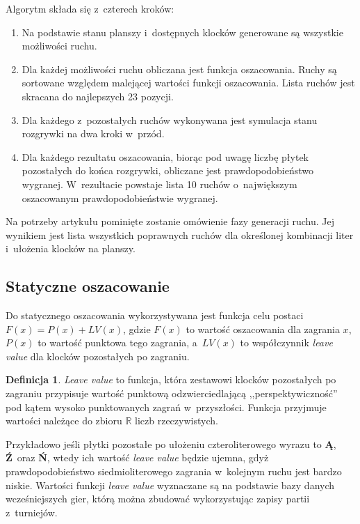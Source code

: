 \documentclass[a4paper,twocolumn,12pt]{article}
\theoremstyle{definition}
\newtheorem{definition}{Definicja}
\begin{document}
Algorytm składa się z~czterech kroków:

\begin{enumerate}
	\item Na podstawie stanu planszy i~dostępnych klocków generowane są wszystkie możliwości ruchu.
	\item Dla każdej możliwości ruchu obliczana jest funkcja oszacowania. Ruchy są sortowane względem malejącej wartości funkcji oszacowania. Lista ruchów jest skracana do najlepszych 23 pozycji.
	\item Dla każdego z~pozostałych ruchów wykonywana jest symulacja stanu rozgrywki na dwa kroki w~przód.
	\item Dla każdego rezultatu oszacowania, biorąc pod uwagę liczbę płytek pozostałych do końca rozgrywki, obliczane jest prawdopodobieństwo wygranej. W~rezultacie powstaje lista 10 ruchów o~największym oszacowanym prawdopodobieństwie wygranej.
\end{enumerate}

Na potrzeby artykułu pominięte zostanie omówienie fazy generacji ruchu. Jej wynikiem jest lista wszystkich poprawnych ruchów dla określonej kombinacji liter i~ułożenia klocków na planszy.

\subsection*{Statyczne oszacowanie}

Do statycznego oszacowania wykorzystywana jest funkcja celu postaci $F(x) = P(x) + LV(x)$, gdzie $F(x)$ to wartość oszacowania dla zagrania $x$, $P(x)$ to wartość punktowa tego zagrania, a~$LV(x)$ to współczynnik \emph{leave value} dla klocków pozostałych po zagraniu.

\begin{definition}
	\emph{Leave value} to funkcja, która zestawowi klocków pozostałych po zagraniu przypisuje wartość punktową odzwierciedlającą ,,perspektywiczność'' pod kątem wysoko punktowanych zagrań w~przyszłości. Funkcja przyjmuje wartości należące do zbioru $\mathbb{R}$ liczb rzeczywistych.
\end{definition}

Przykładowo jeśli płytki pozostałe po ułożeniu czteroliterowego wyrazu to \textbf{Ą}, \textbf{Ź}~oraz \textbf{Ń}, wtedy ich wartość \emph{leave value} będzie ujemna, gdyż prawdopodobieństwo siedmioliterowego zagrania w~kolejnym ruchu jest bardzo niskie. Wartości funkcji \emph{leave value} wyznaczane są na podstawie bazy danych wcześniejszych gier, którą można zbudować wykorzystując zapisy partii z~turniejów.
\end{document}

